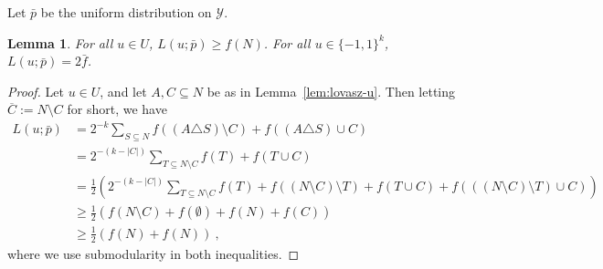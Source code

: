 \documentclass{article}
\newcommand{\Y}{\mathcal{Y}}
\newtheorem{lemma}{Lemma}
\begin{document}
Let $\bar p$ be the uniform distribution on $\Y$.

\begin{lemma}
  \label{lem:2-bar-f}
  For all $u\in U$, $L(u;\bar p) \geq f(N)$.
  For all $u\in \{-1,1\}^k$, $L(u;\bar p) = 2\bar f$.
\end{lemma}
\begin{proof}
  Let $u\in U$, and let $A,C\subseteq N$ be as in Lemma~\ref{lem:lovasz-u}.
  Then letting $\overline C := N\setminus C$ for short, we have
  \begin{align*}
    L(u;\bar p)
    &= 2^{-k} \sum_{S\subseteq N} f((A\triangle S)\setminus C) + f((A\triangle S)\cup C)
    \\
    &= 2^{-(k-|C|)} \sum_{T\subseteq N\setminus C} f(T) + f(T\cup C)
    \\
    &= \frac 1 2 \left( 2^{-(k-|C|)} \sum_{T\subseteq N\setminus C} f(T) + f((N\setminus C)\setminus T) + f(T\cup C) + f(((N\setminus C)\setminus T)\cup C)\right)
    \\
    &\geq \frac 1 2 \left( f(N\setminus C) + f(\emptyset) + f(N) + f(C) \right)
    \\
    &\geq \frac 1 2 \left( f(N) + f(N) \right)~,
  \end{align*}
  where we use submodularity in both inequalities.
\end{proof}
\end{document}
